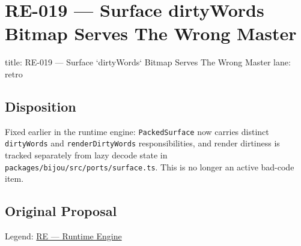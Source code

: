 \chapter{RE-019 --- Surface dirtyWords Bitmap Serves The Wrong Master}\label{record-368}

\smallskip

\begin{RecordMeta}
title: RE-019 — Surface `dirtyWords` Bitmap Serves The Wrong Master
lane: retro

\end{RecordMeta}

\section{Disposition}\label{record-368-disposition}

Fixed earlier in the runtime engine: \texttt{P\allowbreak{}a\allowbreak{}c\allowbreak{}k\allowbreak{}e\allowbreak{}d\allowbreak{}S\allowbreak{}u\allowbreak{}r\allowbreak{}f\allowbreak{}a\allowbreak{}c\allowbreak{}e} now carries distinct \texttt{d\allowbreak{}i\allowbreak{}r\allowbreak{}t\allowbreak{}y\allowbreak{}W\allowbreak{}o\allowbreak{}r\allowbreak{}d\allowbreak{}s} and \texttt{r\allowbreak{}e\allowbreak{}n\allowbreak{}d\allowbreak{}e\allowbreak{}r\allowbreak{}D\allowbreak{}i\allowbreak{}r\allowbreak{}t\allowbreak{}y\allowbreak{}W\allowbreak{}o\allowbreak{}r\allowbreak{}d\allowbreak{}s} responsibilities, and render dirtiness is tracked separately from lazy decode state in \texttt{p\allowbreak{}a\allowbreak{}c\allowbreak{}k\allowbreak{}a\allowbreak{}g\allowbreak{}e\allowbreak{}s\allowbreak{}/\allowbreak{}b\allowbreak{}i\allowbreak{}j\allowbreak{}o\allowbreak{}u\allowbreak{}/\allowbreak{}s\allowbreak{}r\allowbreak{}c\allowbreak{}/\allowbreak{}p\allowbreak{}o\allowbreak{}r\allowbreak{}t\allowbreak{}s\allowbreak{}/\allowbreak{}s\allowbreak{}u\allowbreak{}r\allowbreak{}f\allowbreak{}a\allowbreak{}c\allowbreak{}e\allowbreak{}.\allowbreak{}t\allowbreak{}s}. This is no longer an active bad-code item.

\section{Original Proposal}\label{record-368-original-proposal}

Legend: \href{https://github.com/flyingrobots/bijou/blob/1853ad902f6bf219326409e7f743a5a1d6517dbc/docs/method/legends/RE-runtime-engine.md}{RE --- Runtime Engine}

